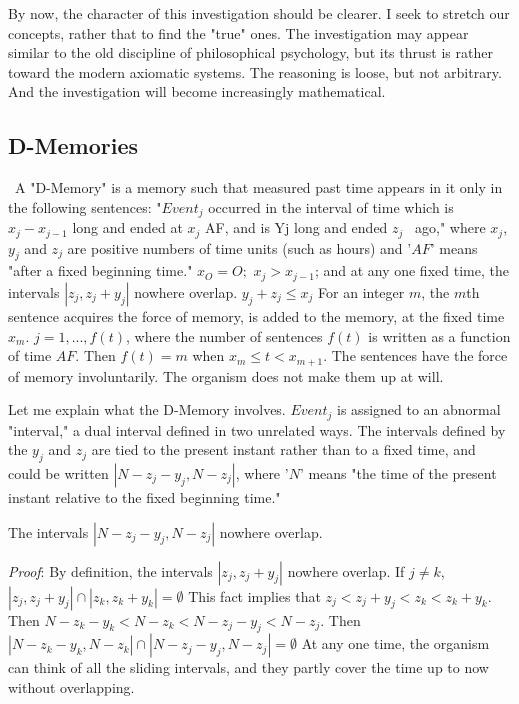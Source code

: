 \documentclass[10pt,twoside]{memoir}
\begin{document}
\begin{enumerate}
{\begin{enumerate}
\begin{sysrules}
\begin{sysrules}
\begin{sysrules}
\begin{sysrules}
{\begin{enumerate}
By now, the character of this investigation should be clearer. I seek to 
stretch our concepts, rather that to find the "true" ones. The investigation 
may appear similar to the old discipline of philosophical psychology, but its 
thrust is rather toward the modern axiomatic systems. The reasoning is 
loose, but not arbitrary. And the investigation will become increasingly 
mathematical. 


\subsection{D-Memories}

\ A "D-Memory" is a memory such that measured past time 
appears in it only in the following sentences: "$Event_j$ occurred in the interval 
of time which is $x_j-x_{j-1}$ long and ended at $x_j$ AF, and is Yj long and ended $z_j$
\ ago," where $x_j$, $y_j$ and $z_j$ are positive numbers of time units (such as hours) 
and '$AF$' means "after a fixed beginning time." $x_O=O;$ $x_j\greater x_{j-1}$; and at any 
one fixed time, the intervals $|z_j, z_j+y_j|$ nowhere overlap. $y_j+z_j\leq x_j$ For an
integer $m$, the $m$th sentence acquires the force of memory, is added to the 
memory, at the fixed time $x_m$. $j=1, ..., f(t)$, where the number of sentences 
$f(t)$ is written as a function of time $AF$. Then $f(t)=m$ when $x_m \leq t \less x_{m+1}$. 
The sentences have the force of memory involuntarily. The organism does 
not make them up at will. 

Let me explain what the D-Memory involves. $Event_j$ is assigned to an 
abnormal "interval," a dual interval defined in two unrelated ways. The 
intervals defined by the $y_j$ and $z_j$ are tied to the present instant rather than to 
a fixed time, and could be written $|N-z_j-y_j, N-z_j|$, where '$N$' means "the time 
of the present instant relative to the fixed beginning time." 

\newcommand{\proof}{\textit{Proof}}

 The intervals $|N-z_j-y_j, N-z_j|$ nowhere overlap. 

\proof: By definition, the intervals $|z_j, z_j+y_j|$ nowhere overlap. If $j\neq k$,
$|z_j, z_j+y_j|\cap|z_k, z_k+y_k|=\emptyset$ 
This fact implies that \eg $z_j\less z_j+y_j\less z_k\less z_k+y_k$.
Then $N-z_k-y_k\less N-z_k\less N-z_j-y_j\less N-z_j$.
Then $|N-z_k-y_k, N-z_k|\cap|N-z_j-y_j, N-z_j|=\emptyset$
At any one time, the organism can think of all the sliding intervals, and they 
partly cover the time up to now without overlapping. 


\end{enumerate}}
\end{sysrules}
\end{sysrules}
\end{sysrules}
\end{sysrules}
\end{enumerate}}
\end{enumerate}
\end{document}
